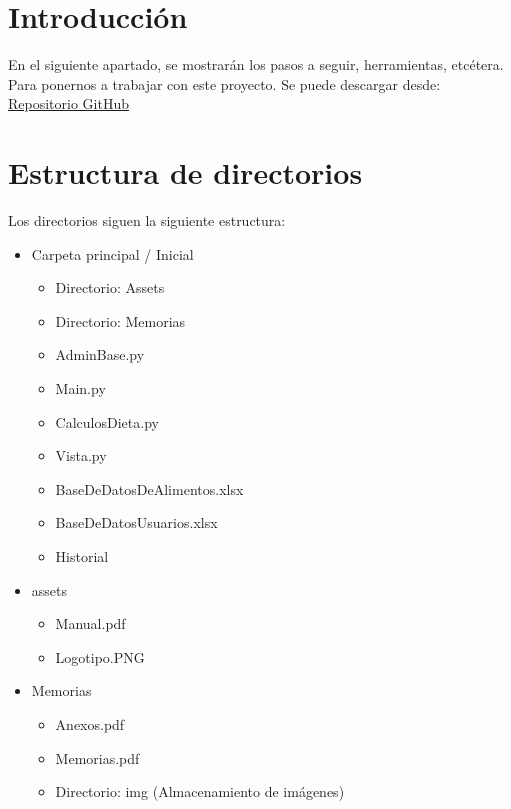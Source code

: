 
\section{Introducción}
En el siguiente apartado, se mostrarán los pasos a seguir, herramientas, etcétera. Para ponernos a trabajar con este proyecto.
Se puede descargar desde: \href{https://github.com/jct0024/HealthApp}{Repositorio GitHub}
\section{Estructura de directorios}
Los directorios siguen la siguiente estructura:
\begin{itemize}
\item Carpeta principal / Inicial
\begin{itemize}
\item Directorio: Assets
\item Directorio: Memorias
\item AdminBase.py
\item Main.py
\item CalculosDieta.py
\item Vista.py
\item BaseDeDatosDeAlimentos.xlsx
\item BaseDeDatosUsuarios.xlsx
\item Historial
\end{itemize}
\item assets
\begin{itemize}
\item Manual.pdf
\item Logotipo.PNG
\end{itemize}
\item Memorias
\begin{itemize}
\item Anexos.pdf
\item Memorias.pdf
\item Directorio: img (Almacenamiento de imágenes)
\end{itemize}
\end{itemize}
